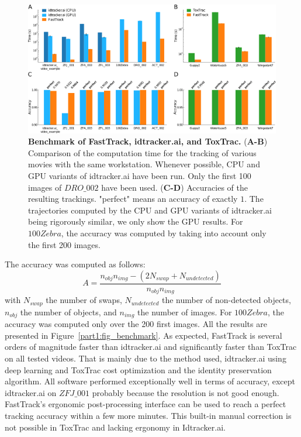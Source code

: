 	\begin{figure}[h!]
    \centering
    \includegraphics[width=\textwidth]{part_1/assets/Figure_benchmark.png}
    \caption{{\bf Benchmark of FastTrack, idtracker.ai, and ToxTrac.}
        (\textbf{A-B}) Comparison of the computation time for the tracking of various movies with the same workstation. Whenever possible, CPU and GPU variants of idtracker.ai have been run. Only the first 100 images of $DRO\_002$ have been used.
        (\textbf{C-D}) Accuracies of the resulting trackings. "perfect" means an accuracy of exactly $1$. The trajectories computed by the CPU and GPU variants of idtracker.ai being rigorously similar, we only show the GPU results. For $100Zebra$, the accuracy was computed by taking into account only the first 200 images.}
    \label{part_1:fig_benchmark}
    \end{figure}

    The accuracy was computed as follows:
    \begin{equation}
     A=\frac{n_{obj}n_{img} - (2N_{swap} + N_{undetected})}{n_{obj}n_{img}}
    \end{equation}
    with $N_{swap}$ the number of swaps, $N_{undetected}$ the number of non-detected objects, $n_{obj}$ the number of objects, and $n_{img}$ the number of images.
    For $100Zebra$, the accuracy was computed only over the 200 first images. All the results are presented in Figure~\ref{part1:fig_benchmark}. As expected, FastTrack is several orders of magnitude faster than idtracker.ai and significantly faster than ToxTrac on all tested videos. That is mainly due to the method used, idtracker.ai using deep learning and ToxTrac cost optimization and the identity preservation algorithm.
    All software performed exceptionally well in terms of accuracy, except idtracker.ai on $ZFJ\_001$ probably because the resolution is not good enough.
    FastTrack's ergonomic post-processing interface can be used to reach a perfect tracking accuracy within a few more minutes. This built-in manual correction is not possible in ToxTrac and lacking ergonomy in Idtracker.ai.

